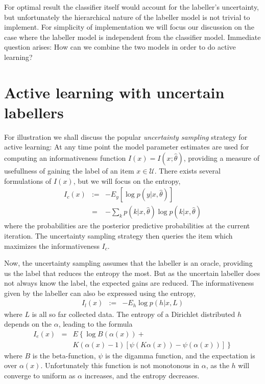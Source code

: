 \documentclass[10pt, onecolumn]{article}
\newcommand{\U}{\mathcal{U}}
\begin{document}
For optimal result the classifier itself would account for the labeller's uncertainty, but unfortunately the hierarchical nature of the labeller model is not trivial to implement. For simplicity of implementation we will focus our discussion on the case where the labeller model is independent from the classifier model. Immediate question arises: How can we combine the two models in order to do active learning?

\section{Active learning with uncertain labellers}
For illustration we shall discuss the popular \emph{uncertainty sampling} strategy for active learning: At any time point the model parameter estimates are used for computing an informativeness function $I(x)=I(x;\hat\theta)$, providing a measure of usefullness of gaining the label of an item $x\in \U$. There exists several formulations of $I(x)$, but we will focus on the entropy, 
\begin{eqnarray}
I_c(x)&:=&-E_y [\log p(y|x,\hat\theta)]\\ 
&=&-\sum_k p(k|x,\hat\theta)\log p(k|x,\hat\theta)
\end{eqnarray}
where the probabilities are the posterior predictive probabilities at the current iteration. The uncertainty sampling strategy then queries the item which maximizes the informativeness $I_c$.


Now, the uncertainty sampling assumes that the labeller is an oracle, providing us the label that reduces the entropy the most. But as the uncertain labeller does not always know the label, the expected gains are reduced. The informativeness given by the labeller can also be expressed using the entropy,
\begin{eqnarray}
I_l(x)&:=& -E_h \log p(h|x, L)
\end{eqnarray}
where $L$ is all so far collected data. The entropy of a Dirichlet distributed $h$ depends on the $\alpha$, leading to the formula
\begin{eqnarray}
I_e(x)&=& E\left\{ \log B(\alpha(x)) + \right. \\
& &\left. K(\alpha(x)-1)[\psi(K\alpha(x))-\psi(\alpha(x))] \right\}\nonumber
\end{eqnarray}
where $B$ is the beta-function, $\psi$ is the digamma function, and the expectation is over $\alpha(x)$. Unfortunately this function is not monotonous in $\alpha$, as the $h$ will converge to uniform as $\alpha$ increases, and the entropy decreases. 
\end{document}
